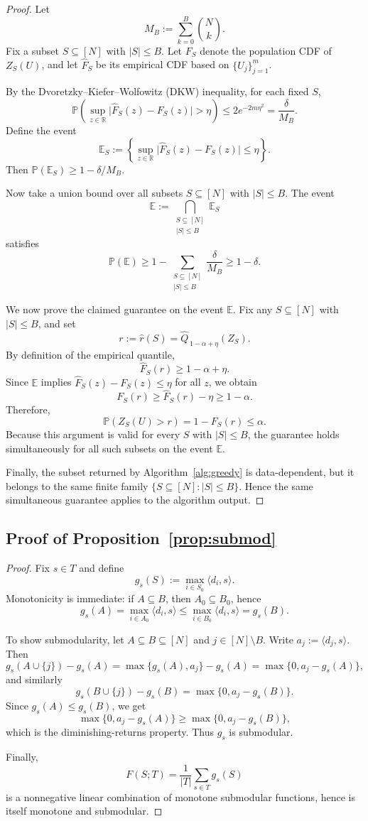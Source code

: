 \documentclass[accepted]{uai2026}
\theoremstyle{plain}
\theoremstyle{definition}
\theoremstyle{remark}
\newcommand{\R}{\mathbb{R}}
\newcommand{\E}{\mathbb{E}}
\begin{document}
\begin{proof}
Let
\[
M_B := \sum_{k=0}^{B}\binom{N}{k}.
\]
Fix a subset $S\subseteq[N]$ with $|S|\le B$. Let $F_S$ denote the population CDF of $Z_S(U)$, and let $\widehat F_S$ be its empirical CDF based on $\{U_j\}_{j=1}^m$.

By the Dvoretzky--Kiefer--Wolfowitz (DKW) inequality, for each fixed $S$,
\[
\mathbb{P}\!\left(\sup_{z\in\R}\bigl|\widehat F_S(z)-F_S(z)\bigr|>\eta\right)
\le 2e^{-2m\eta^2}
= \frac{\delta}{M_B}.
\]
Define the event
\[
\E_S := \left\{\sup_{z\in\R}\bigl|\widehat F_S(z)-F_S(z)\bigr|\le \eta\right\}.
\]
Then $\mathbb{P}(\E_S)\ge 1-\delta/M_B$.

Now take a union bound over all subsets $S\subseteq[N]$ with $|S|\le B$. The event
\[
\E := \bigcap_{\substack{S\subseteq[N]\\|S|\le B}}\E_S
\]
satisfies
\[
\mathbb{P}(\E)\ge 1-\sum_{\substack{S\subseteq[N]\\|S|\le B}}\frac{\delta}{M_B}\ge 1-\delta.
\]

We now prove the claimed guarantee on the event $\E$.
Fix any $S\subseteq[N]$ with $|S|\le B$, and set
\[
r:=\widehat r(S)=\widehat Q_{\,1-\alpha+\eta}(Z_S).
\]
By definition of the empirical quantile,
\[
\widehat F_S(r)\ge 1-\alpha+\eta.
\]
Since $\E$ implies $\widehat F_S(z)-F_S(z)\le \eta$ for all $z$, we obtain
\[
F_S(r)\ge \widehat F_S(r)-\eta \ge 1-\alpha.
\]
Therefore,
\[
\mathbb{P}\!\left(Z_S(U)>r\right)=1-F_S(r)\le \alpha.
\]
Because this argument is valid for every $S$ with $|S|\le B$, the guarantee holds simultaneously for all such subsets on the event $\E$.

Finally, the subset returned by Algorithm~\ref{alg:greedy} is data-dependent, but it belongs to the same finite family $\{S\subseteq[N]: |S|\le B\}$. Hence the same simultaneous guarantee applies to the algorithm output.
\end{proof}



\subsection{Proof of Proposition~\ref{prop:submod}}
\label{app:prop4_1}

\begin{proof}
Fix $s\in T$ and define
\[
g_s(S):=\max_{i\in S_0}\langle d_i,s\rangle.
\]
Monotonicity is immediate: if $A\subseteq B$, then $A_0\subseteq B_0$, hence
\[
g_s(A)=\max_{i\in A_0}\langle d_i,s\rangle
\le
\max_{i\in B_0}\langle d_i,s\rangle
=g_s(B).
\]

To show submodularity, let $A\subseteq B\subseteq [N]$ and $j\in [N]\setminus B$. Write $a_j:=\langle d_j,s\rangle$. Then
\[
g_s(A\cup\{j\})-g_s(A)=\max\{g_s(A),a_j\}-g_s(A)=\max\{0,a_j-g_s(A)\},
\]
and similarly
\[
g_s(B\cup\{j\})-g_s(B)=\max\{0,a_j-g_s(B)\}.
\]
Since $g_s(A)\le g_s(B)$, we get
\[
\max\{0,a_j-g_s(A)\}\ge \max\{0,a_j-g_s(B)\},
\]
which is the diminishing-returns property. Thus $g_s$ is submodular.

Finally,
\[
F(S;T)=\frac1{|T|}\sum_{s\in T} g_s(S)
\]
is a nonnegative linear combination of monotone submodular functions, hence is itself monotone and submodular.
\end{proof}
\end{document}
